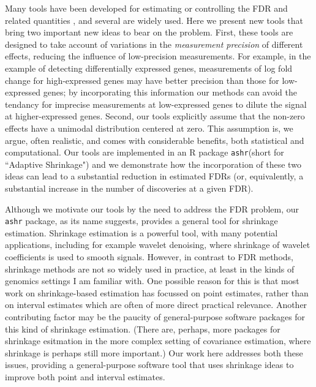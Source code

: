 \documentclass[11pt]{article}
\def\ashr{{\tt ashr}\xspace}
\begin{document}
%

Many tools have been developed for estimating or controlling the FDR and related quantities \cite{}, and several are widely used.
Here we present new tools that bring two important new ideas to bear on the problem.
First, these tools are designed to take account of variations in the {\it measurement precision} of different effects, reducing the influence of low-precision measurements.
For example, in the example of detecting differentially expressed genes, measurements of log fold change for high-expressed genes 
may have better precision than those for low-expressed genes; by incorporating this information our methods can avoid the tendancy for 
imprecise measurements at low-expressed genes to dilute the signal at higher-expressed genes.
Second, our tools explicitly assume that the non-zero effects have a unimodal distribution centered at zero. This assumption 
is, we argue, often realistic, and comes with considerable benefits, both statistical and computational. 
Our tools are implemented in an R package \ashr (short for ``Adaptive Shrinkage") and we 
demonstrate how the incorporation of these two ideas can lead to a substantial reduction in estimated FDRs (or, equivalently,
a substantial increase in the number of discoveries at a given FDR).  

Although we motivate our tools by the need to address the FDR problem, our \ashr package, as its name suggests, 
provides a general tool for shrinkage estimation. Shrinkage estimation is a powerful tool, with many potential applications, including for example wavelet denoising, 
where shrinkage of wavelet coefficients is used to smooth signals. 
However, in contrast to FDR methods, shrinkage methods are not so widely used in practice, at least in the kinds
of genomics settings I am familiar with. One possible reason for this is that most work on shrinkage-based estimation has focussed
on point estimates, rather than on interval estimates which are often of more direct practical relevance. Another contributing
factor may be the paucity of general-purpose software packages for this kind of shrinkage estimation.
 (There are, perhaps, more packages for shrinkage esitmation in the more complex setting of covariance estimation, where shrinkage is perhaps still more important.)
Our work here addresses both these issues, providing a general-purpose software tool that uses shrinkage ideas to improve both
point and interval estimates.
\end{document}
